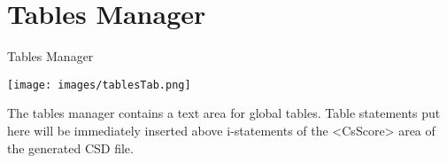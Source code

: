 \section{Tables Manager}\label{tablesManager}

Tables Manager

\texttt{[image: images/tablesTab.png]}

The tables manager contains a text area for global tables. Table
statements put here will be immediately inserted above i-statements of
the \textless{}CsScore\textgreater{} area of the generated CSD file.
